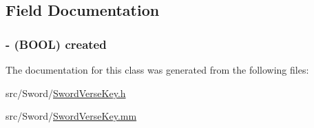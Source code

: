\subsection{Field Documentation}
\hypertarget{interface_sword_verse_key_ae652d20fc5dc8a8c3358805ceffc84c2}{
\subsubsection[{created}]{\setlength{\rightskip}{0pt plus 5cm}-\/ (B\-O\-O\-L) created\hspace{0.3cm}{\ttfamily [protected]}}}\label{interface_sword_verse_key_ae652d20fc5dc8a8c3358805ceffc84c2}


The documentation for this class was generated from the following files\-:\begin{DoxyCompactItemize}
\item 
src/\-Sword/\hyperlink{_sword_verse_key_8h}{Sword\-Verse\-Key.\-h}\item 
src/\-Sword/\hyperlink{_sword_verse_key_8mm}{Sword\-Verse\-Key.\-mm}\end{DoxyCompactItemize}
